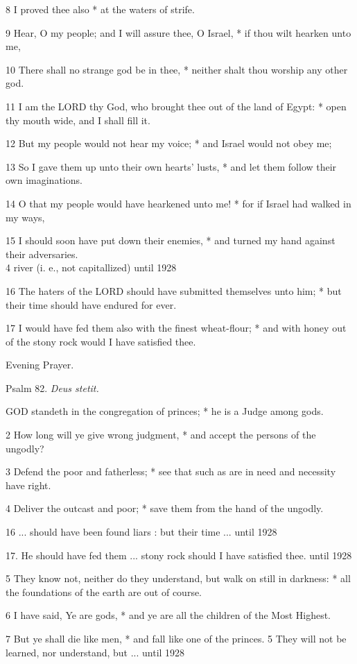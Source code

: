 8 I proved thee also * at the waters of strife.

9 Hear, O my people; and I will assure thee, O Israel,
* if thou wilt hearken unto me,

10 There shall no strange god be in thee, * neither
shalt thou worship any other god.

11 I am the LORD thy God, who brought thee out of the
land of Egypt: * open thy mouth wide, and I shall fill it.

12 But my people would not hear my voice; * and Israel
would not obey me;

13 So I gave them up unto their own hearts' lusts,
* and let them follow their own imaginations.

14 O that my people would have hearkened unto me! *
for if Israel had walked in my ways,

15 I should soon have put down their enemies, * and
turned my hand against their adversaries. \\
4 river (i.
e., not capitallized) until 1928

16 The haters of the LORD should have submitted themselves unto him; *
but their time should have endured for ever.

17 I would have fed them also with the finest wheat-flour;
* and with honey out of the stony rock would I have satisfied thee. 

Evening
Prayer.

Psalm
82. \emph{Deus stetit.}

GOD
standeth in the congregation of princes; * he is a Judge among gods.

2 How long will ye give wrong judgment, * and accept
the persons of the ungodly?

3 Defend the poor and fatherless; * see that such as
are in need and necessity have right.

4 Deliver the outcast and poor; * save them from the
hand of the ungodly.

16 ... should have been found liars
: but their time ...
until 1928

17. He should have fed them ... stony rock should
I have satisfied thee.
until 1928

5 They know not, neither do they understand, but walk on still in darkness:
* all the foundations of the earth are out of course.

6 I have said, Ye are gods, * and ye are all the children
of the Most Highest.

7 But ye shall die like men, * and fall like one of the
princes. 5 They will not be learned,
nor understand, but ...
until 1928

